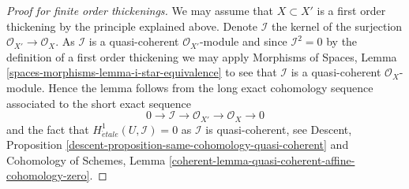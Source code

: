 \documentclass[10pt,a4paper]{amsart}
\theoremstyle{plain}
\theoremstyle{definition}
\theoremstyle{remark}
\numberwithin{equation}{subsection}
\def\etale{{\acute{e}tale}}
\begin{document}
\begin{proof}[Proof for finite order thickenings]
We may assume that $X \subset X'$ is a first order thickening by the
principle explained above. Denote $\mathcal{I}$ the kernel of the surjection
$\mathcal{O}_{X'} \to \mathcal{O}_X$. As $\mathcal{I}$ is a quasi-coherent
$\mathcal{O}_{X'}$-module and since $\mathcal{I}^2 = 0$ by the definition
of a first order thickening we may apply
Morphisms of Spaces, Lemma
\ref{spaces-morphisms-lemma-i-star-equivalence}
to see that $\mathcal{I}$ is a quasi-coherent $\mathcal{O}_X$-module.
Hence the lemma follows from the long exact cohomology sequence
associated to the short exact sequence
$$
0 \to \mathcal{I} \to \mathcal{O}_{X'} \to \mathcal{O}_X \to 0
$$
and the fact that $H^1_\etale(U, \mathcal{I}) = 0$ as
$\mathcal{I}$ is quasi-coherent, see
Descent, Proposition \ref{descent-proposition-same-cohomology-quasi-coherent}
and Cohomology of Schemes, Lemma
\ref{coherent-lemma-quasi-coherent-affine-cohomology-zero}.
\end{proof}
\end{document}
